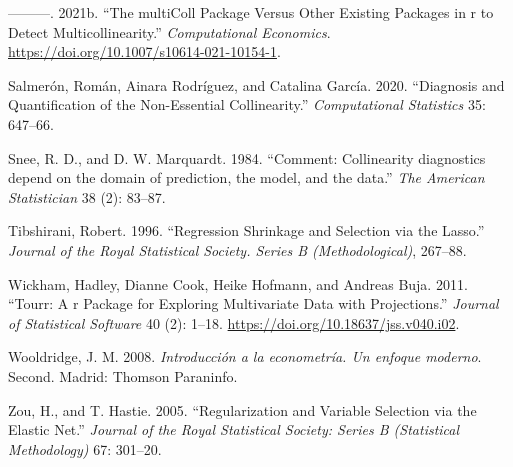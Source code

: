 \begin{CSLReferences}{1}{0}
\leavevmode{}%
---------. 2021b. {``The multiColl Package Versus Other Existing Packages in r to Detect Multicollinearity.''} \emph{Computational Economics}. \url{https://doi.org/10.1007/s10614-021-10154-1}.

\leavevmode{}%
Salmerón, Román, Ainara Rodríguez, and Catalina García. 2020. {``Diagnosis and Quantification of the Non-Essential Collinearity.''} \emph{Computational Statistics} 35: 647--66.

\leavevmode{}%
Snee, R. D., and D. W. Marquardt. 1984. {``{Comment: Collinearity diagnostics depend on the domain of prediction, the model, and the data}.''} \emph{The American Statistician} 38 (2): 83--87.

\leavevmode{}%
Tibshirani, Robert. 1996. {``Regression Shrinkage and Selection via the Lasso.''} \emph{Journal of the Royal Statistical Society. Series B (Methodological)}, 267--88.

\leavevmode{}%
Wickham, Hadley, Dianne Cook, Heike Hofmann, and Andreas Buja. 2011. {``Tourr: A r Package for Exploring Multivariate Data with Projections.''} \emph{Journal of Statistical Software} 40 (2): 1--18. \url{https://doi.org/10.18637/jss.v040.i02}.

\leavevmode{}%
Wooldridge, J. M. 2008. \emph{{Introducción a la econometría. Un enfoque moderno}}. Second. Madrid: Thomson Paraninfo.

\leavevmode{}%
Zou, H., and T. Hastie. 2005. {``Regularization and Variable Selection via the Elastic Net.''} \emph{Journal of the Royal Statistical Society: Series B (Statistical Methodology)} 67: 301--20.

\end{CSLReferences}



\address{%
Roman Salmeron Gomez\\
University of Granada\\%
Department of Quantitative Methods for Economics and Busines\\ Poligono La Cartuja sn, 18071, Granada, Spain.\\
%
\url{http://metodoscuantitativos.ugr.es/pages/web/romansg}\\%
\textit{ORCiD: \href{https://orcid.org/0000-0003-2589-4058}{0000-0003-2589-4058}}\\%
\href{mailto:romansg@ugr.es}{\nolinkurl{romansg@ugr.es}}%
}

